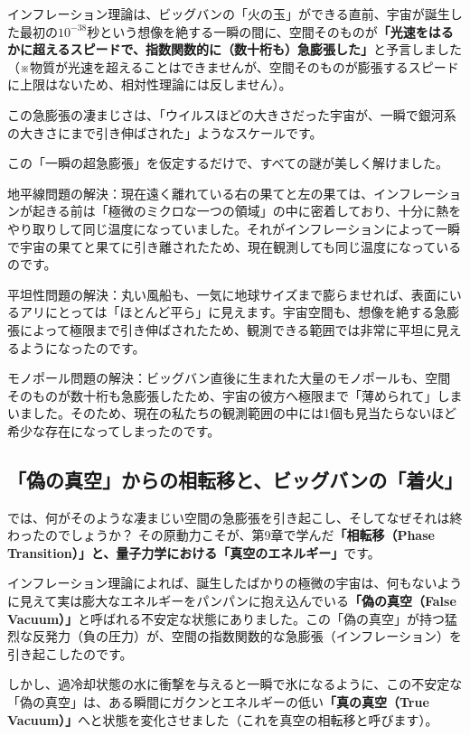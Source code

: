 インフレーション理論は、ビッグバンの「火の玉」ができる直前、宇宙が誕生した最初の\(10^{-38}\)秒という想像を絶する一瞬の間に、空間そのものが\textbf{「光速をはるかに超えるスピードで、指数関数的に（数十桁も）急膨張した」}と予言しました（※物質が光速を超えることはできませんが、空間そのものが膨張するスピードに上限はないため、相対性理論には反しません）。

この急膨張の凄まじさは、「ウイルスほどの大きさだった宇宙が、一瞬で銀河系の大きさにまで引き伸ばされた」ようなスケールです。

この「一瞬の超急膨張」を仮定するだけで、すべての謎が美しく解けました。

地平線問題の解決：現在遠く離れている右の果てと左の果ては、インフレーションが起きる前は「極微のミクロな一つの領域」の中に密着しており、十分に熱をやり取りして同じ温度になっていました。それがインフレーションによって一瞬で宇宙の果てと果てに引き離されたため、現在観測しても同じ温度になっているのです。

平坦性問題の解決：丸い風船も、一気に地球サイズまで膨らませれば、表面にいるアリにとっては「ほとんど平ら」に見えます。宇宙空間も、想像を絶する急膨張によって極限まで引き伸ばされたため、観測できる範囲では非常に平坦に見えるようになったのです。

モノポール問題の解決：ビッグバン直後に生まれた大量のモノポールも、空間そのものが数十桁も急膨張したため、宇宙の彼方へ極限まで「薄められて」しまいました。そのため、現在の私たちの観測範囲の中には1個も見当たらないほど希少な存在になってしまったのです。

\subsection{「偽の真空」からの相転移と、ビッグバンの「着火」}

では、何がそのような凄まじい空間の急膨張を引き起こし、そしてなぜそれは終わったのでしょうか？ その原動力こそが、第9章で学んだ\textbf{「相転移（Phase Transition）」と、量子力学における「真空のエネルギー」}です。

インフレーション理論によれば、誕生したばかりの極微の宇宙は、何もないように見えて実は膨大なエネルギーをパンパンに抱え込んでいる\textbf{「偽の真空（False Vacuum）」}と呼ばれる不安定な状態にありました。この「偽の真空」が持つ猛烈な反発力（負の圧力）が、空間の指数関数的な急膨張（インフレーション）を引き起こしたのです。

しかし、過冷却状態の水に衝撃を与えると一瞬で氷になるように、この不安定な「偽の真空」は、ある瞬間にガクンとエネルギーの低い\textbf{「真の真空（True Vacuum）」}へと状態を変化させました（これを真空の相転移と呼びます）。

